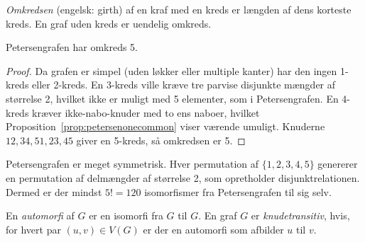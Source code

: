 \begin{definition}[Omkreds]
	\textit{Omkredsen} (engelsk: girth) af en kraf med en kreds er længden af dens korteste kreds. En graf uden kreds er uendelig omkreds.
\end{definition}

\begin{corollary}
	Petersengrafen har omkreds 5.
\end{corollary}
\begin{proof}
	Da grafen er simpel (uden løkker eller multiple kanter) har den ingen 1-kreds eller 2-kreds. En 3-kreds ville kræve tre parvise disjunkte mængder af størrelse 2, hvilket ikke er muligt med 5 elementer, som i Petersengrafen.
	En 4-kreds kræver ikke-nabo-knuder med to ens naboer, hvilket Proposition~\ref{prop:petersenonecommon} viser værende umuligt.
	Knuderne $12, 34, 51, 23, 45$ giver en 5-kreds, så omkredsen er 5.
\end{proof}

Petersengrafen er meget symmetrisk. Hver permutation af $\{1,2,3,4,5\}$ genererer en permutation af delmængder af størrelse 2, som opretholder disjunktrelationen. Dermed er der mindst $5! = 120$ isomorfismer fra Petersengrafen til sig selv.

\begin{definition}
	En \textit{automorfi} af $G$ er en isomorfi fra $G$ til $G$. En graf $G$ er \textit{knudetransitiv}, hvis, for hvert par $(u,v) \in V(G)$ er der en automorfi som afbilder $u$ til $v$.
\end{definition}

